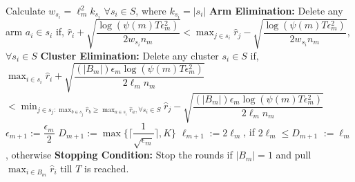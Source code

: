 \begin{algorithmic}[1]
\State \hspace*{2em} Calculate $w_{s_{i}}=\ell_{m}^{2}k_{s_{i}}$ $\forall s_{i}\in S$, where $k_{s_{i}}=|s_{i}|$
\State \hspace*{2em} \textbf{Arm Elimination:}
\State \hspace*{2em} Delete any arm $a_{i}\in s_{i}$ if,
\newline\hspace*{2em}$\hat{r}_{i} + \sqrt{\dfrac{\log{(\psi(m)T\epsilon_{m}^{2})}}{2w_{s_{i}}n_{m}}}  < \max_{j\in s_{i}}\hat{r}_{j} -\sqrt{\dfrac{\log{(\psi(m)T\epsilon_{m}^{2})}}{2w_{s_{i}}n_{m}}} $, $\forall s_{i}\in S$ 
\State \hspace*{2em} \textbf{Cluster Elimination:}
\State \hspace*{2em} Delete any cluster $s_{i}\in S$ if, $\max_{i\in s_{i}}\hat{r}_{i} + \sqrt{\dfrac{(|B_{m}|)\epsilon_{m}\log{(\psi(m)T\epsilon_{m}^{2})}}{2\ell_{m} n_{m}}}  $\newline\hspace*{4em}$< \min_{j\in s_{j}:\max_{b\in s_{j}}{\hat{r}_{b}}\geq \max_{a\in s_{i}}\hat{r}_{a},\forall s_{i}\in S}\hat{r}_{j} - \sqrt{\dfrac{(|B_{m}|)\epsilon_{m}\log{(\psi(m)T\epsilon_{m}^{2})}}{2\ell_{m} n_{m}}}$
\State \hspace*{2em} $\epsilon_{m+1}:=\dfrac{\epsilon_{m}}{2}$
\State \hspace*{2em} $D_{m+1}:=\max{\bigg\lbrace\bigg\lceil\dfrac{1}{\sqrt{\epsilon_{m}}}\bigg\rceil,K\bigg\rbrace}$
\State \hspace*{2em} $\ell_{m+1}:=2\ell_{m}$, if $2\ell_{m}\leq D_{m+1}$
\newline\hspace*{4.9em}$:=\ell_{m}$ , otherwise
\State \hspace*{2em} \textbf{Stopping Condition:} 
\State \hspace*{2em} Stop the rounds if $|B_{m}|=1$ and pull $\max_{i\in B_{m}}\hat{r}_{i}$ till $T$ is reached.
\end{algorithmic}
\noindent\makebox[\linewidth]{\rule{\textwidth}{0.4pt}}\\[-0.6cm]

